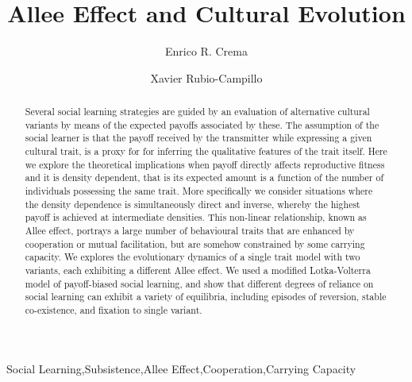 \documentclass[review,authoryear]{elsarticle}
\begin{document}
\begin{frontmatter}

\title{Allee Effect and Cultural Evolution}


\author[label1,label2]{Enrico R. Crema}
\author[label3]{Xavier Rubio-Campillo}

\address[label1]{CaSEs - Complexity and Socio-Ecological Dynamics Research Group, Barcelona}
\address[label2]{UCL Institute of Archaeology}
\address[label3]{BSC - Barcelona Supercomputing Center}



\begin{abstract}
Several social learning strategies are guided by an evaluation of alternative cultural variants by means of the expected payoffs associated by these. The assumption of the social learner is that the payoff received by the transmitter while expressing a given cultural trait, is a proxy for for inferring the qualitative features of the trait itself. Here we explore the theoretical implications when payoff directly affects reproductive fitness and it is density dependent, that is its expected amount is a function of the number of individuals possessing the same trait. More specifically we consider situations where the density dependence is simultaneously direct and inverse, whereby the highest payoff is achieved at intermediate densities. This non-linear relationship, known as Allee effect, portrays a large number of behavioural traits that are enhanced by cooperation or mutual facilitation, but are somehow constrained by some carrying capacity.  We  explores the evolutionary dynamics of a single trait model with two variants, each exhibiting a different Allee effect. We used a modified Lotka-Volterra model of payoff-biased social learning, and show that different degrees of reliance on social learning can exhibit a variety of equilibria, including episodes of reversion, stable co-existence, and fixation to single variant.

\end{abstract}

\begin{keyword}
Social Learning\sep Subsistence\sep Allee Effect\sep Cooperation\sep Carrying Capacity
\end{keyword}

\end{frontmatter}
\end{document}
